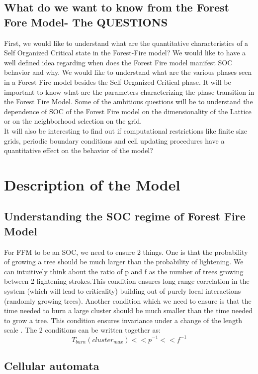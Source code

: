 \documentclass[11pt]{article}
\def \beq{\begin{equation}}
\def \eeq{\end{equation}}
\def \beq{\begin{equation}}
\def \eeq{\end{equation}}
\begin{document}
\subsection{What do we want to know from the Forest Fore Model- The QUESTIONS}
First, we would like to understand what are the quantitative characteristics of a Self Organized Critical state in the Forest-Fire model? We would like to have a well defined idea regarding when does the Forest Fire model manifest SOC behavior and why. We would like to understand what are the various phases seen in a Forest Fire model besides the Self Organized Critical phase. It will be important to know what are the parameters characterizing the phase transition in the Forest Fire Model.
Some of the ambitious questions will be to understand the dependence of SOC of the Forest Fire model on the dimensionality of the Lattice or on the neighborhood selection on the grid.\\
It will also be interesting to find out if computational restrictions like finite size grids, periodic boundary conditions and cell updating procedures have a quantitative effect on the behavior of the model?



\section{Description of the Model}

\subsection{Understanding the SOC regime of Forest Fire Model}

For FFM to be an SOC, we need to ensure 2 things. One is that the probability of growing a tree should be much larger than the probability of lightening. We can intuitively think about the ratio of p and f as the number of trees growing between 2 lightening strokes.This condition ensures long range correlation in the system (which will lead to criticality) building out of purely local interactions (randomly growing trees). Another condition which we need to ensure is that the time needed to burn a large cluster should be much smaller than the time needed to grow a tree. This condition ensures invariance under a change of the length scale \cite{ref1}. The 2 conditions can be written together as:
\beq
T_{burn}(cluster_{max})<<p^{-1}<<f^{-1}
\eeq

\subsection{Cellular automata}
\end{document}
